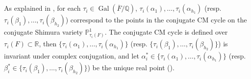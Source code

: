\documentclass{amsart}
\numberwithin{equation}{subsection}
\numberwithin{theorem}{section}
\theoremstyle{definition}
\theoremstyle{remark}
\newcommand{\bP}{\mathbb{P}}
\newcommand{\bQ}{\mathbb{Q}}
\newcommand{\bR}{\mathbb{R}}
\DeclareMathOperator{\Gal}{Gal}
\begin{document}
\subsection{} \label{sec:main3}
As explained in , for each $\tau_i \in \Gal(\overline{F}/\bQ)$, $\tau_i(\alpha_1), \dotsc, \tau_i(\alpha_{h_1})$ (resp. $\tau_i(\beta_{1}), \dotsc, \tau_i(\beta_{h_2})$) correspond to the points in the conjugate CM cycle on the conjugate Shimura variety $\bP^1_{\tau_i(F)}$. The conjugate CM cycle is defined over $\tau_i(F) \subset \bR$, then $\{\tau_i(\alpha_1), \dotsc, \tau_i(\alpha_{h_1})\}$ (resp. $\{\tau_i(\beta_1), \dotsc, \tau_i(\beta_{h_2})\}$) is invariant under complex conjugation,
and let $\alpha_i^* \in \{\tau_i(\alpha_1), \dotsc, \tau_i(\alpha_{h_1})\}$ (resp. $\beta_i^* \in \{\tau_i(\beta_1), \dotsc, \tau_i(\beta_{h_2})\}$) be the unique real point (). 
\end{document}
